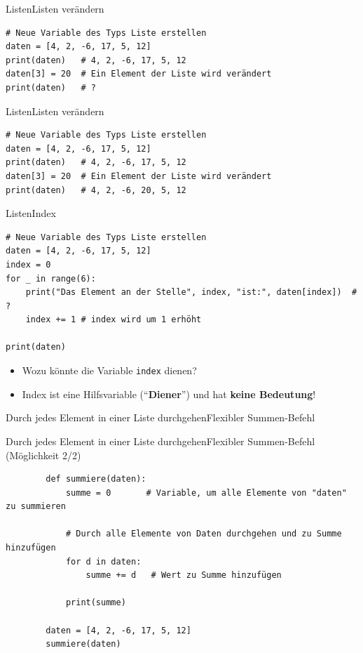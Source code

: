 \begin{frame}[fragile]{Listen}{Listen verändern}
	\begin{lstlisting}
# Neue Variable des Typs Liste erstellen
daten = [4, 2, -6, 17, 5, 12]
print(daten)   # 4, 2, -6, 17, 5, 12
daten[3] = 20  # Ein Element der Liste wird verändert
print(daten)   # ?
\end{lstlisting}
\end{frame}

\begin{frame}[fragile]{Listen}{Listen verändern}
	\begin{lstlisting}
# Neue Variable des Typs Liste erstellen
daten = [4, 2, -6, 17, 5, 12]
print(daten)   # 4, 2, -6, 17, 5, 12
daten[3] = 20  # Ein Element der Liste wird verändert
print(daten)   # 4, 2, -6, 20, 5, 12
\end{lstlisting}
\end{frame}


\begin{frame}[fragile]{Listen}{Index}
	\begin{lstlisting}[basicstyle=\ttfamily\scriptsize]
# Neue Variable des Typs Liste erstellen
daten = [4, 2, -6, 17, 5, 12]
index = 0
for _ in range(6):
	print("Das Element an der Stelle", index, "ist:", daten[index])  # ?
	index += 1 # index wird um 1 erhöht

print(daten)
\end{lstlisting}


	\begin{itemize}[<+->]
		\item Wozu könnte die Variable \lstinline|index| dienen?
		\item Index ist eine Hilfsvariable (\enquote{\textbf{Diener}}) und hat \textbf{keine Bedeutung}!
	\end{itemize}
\end{frame}


\begin{frame}[fragile]{Durch jedes Element in einer Liste durchgehen}{Flexibler Summen-Befehl}
	
\end{frame}


\begin{frame}[fragile]{Durch jedes Element in einer Liste durchgehen}{Flexibler Summen-Befehl (Möglichkeit 2/2)}
	\begin{lstlisting}
		def summiere(daten):
			summe = 0       # Variable, um alle Elemente von "daten" zu summieren

			# Durch alle Elemente von Daten durchgehen und zu Summe hinzufügen
			for d in daten:
				summe += d   # Wert zu Summe hinzufügen

			print(summe)

		daten = [4, 2, -6, 17, 5, 12]
		summiere(daten)
	\end{lstlisting}
\end{frame}


